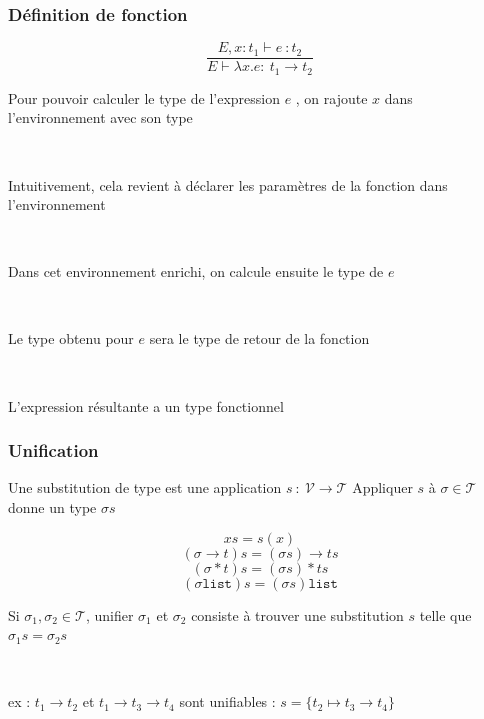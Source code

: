 \documentclass[handout,t]{beamer}
\begin{document}
\begin{frame}

\frametitle{Définition de fonction}

$$
\frac{E,x:t_1 \vdash e\ : t_2}
     {E\vdash \lambda x.e :\ t_1\rightarrow t_2}
$$

Pour pouvoir calculer le type de l'expression
$e$ , on rajoute $x$
dans l'environnement avec son type 

 ~

Intuitivement, cela revient à déclarer les paramètres de la
fonction dans l'environnement

~

Dans cet environnement enrichi, on calcule ensuite le type de
$e$

~

Le type obtenu pour
$e$
sera le type de retour de la fonction

~

L'expression résultante a un type fonctionnel


\end{frame}

\begin{frame}

\frametitle{Unification}

Une substitution de type est une application
$s
\ :\ \mathcal{V}\rightarrow \mathcal{T}$
Appliquer $s$ à $\sigma \in \mathcal{T}$
donne un type
$\sigma s$

$$
xs = s ( x )
$$
$$
(\sigma \rightarrow t ) s = (\sigma s ) \rightarrow ts
$$
$$
(\sigma * t ) s = (\sigma s ) * ts
$$
$$
(\sigma \mathtt{list} ) s = (\sigma s ) \mathtt{list}
$$

Si $\sigma_1,\sigma_2\in\mathcal{T}$, unifier $\sigma_1$ et $\sigma_2$
consiste à trouver une substitution $s$
telle que $\sigma_1 s = \sigma_2 s$

~

\color{blue}
ex : $t_1 \rightarrow t_2$ et $t_1 \rightarrow t_3 \rightarrow t_4$ sont unifiables :
$s = \{ t_2 \mapsto t_3 \rightarrow t_4 \}$



\end{frame}
\end{document}
